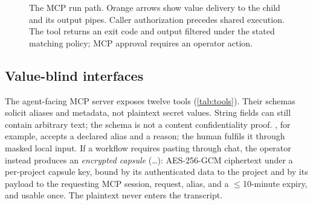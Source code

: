 \documentclass[10pt,twocolumn]{article}
\newcommand{\code}[1]{\textup{\texttt{\detokenize{#1}}}}
\begin{document}
\begin{figure}[t]
\caption{The MCP run path. Orange arrows show value delivery to the child and
its output pipes. Caller authorization precedes shared execution. The tool
returns an exit code and output filtered under the stated matching policy;
MCP approval requires an operator action.}
\label{fig:arch}
\end{figure}

\subsection{Value-blind interfaces}
\label{sec:interfaces}

The agent-facing MCP server exposes twelve tools (\cref{tab:tools}). Their
schemas solicit aliases and metadata, not plaintext secret values.
String fields can still contain arbitrary text; the schema is not a content
confidentiality proof. \code{request_secret}, for example, accepts a declared alias and
a reason; the human fulfils it through masked local input. If a workflow
requires pasting through chat, the operator instead produces an \emph{encrypted
capsule} (\code{ir1.}\ldots): AES-256-GCM ciphertext under a per-project capsule
key, bound by its authenticated data to the project and by its payload to the
requesting MCP session, request, alias, and a $\leq$10-minute expiry, and usable
once. The plaintext never enters the transcript.
\end{document}
